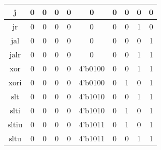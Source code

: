 \documentclass[UTF8]{ctexart}
\begin{document}
\begin{table}[H]
\begin{threeparttable}
\begin{tabular}{|c|c|c|c|c|c|c|c|c|c|}
			\hline
			j                                        & 0                 & 0                 & 0               & 0                 & 0                & 0                & 0               & 0               & 0                 \\
			\hline
			jr                                       & 0                 & 0                 & 0               & 0                 & 0                & 0                & 0               & 1               & 0                 \\
			\hline
			jal                                      & 0                 & 0                 & 0               & 0                 & 0                & 0                & 0               & 0               & 1                 \\
			\hline
			jalr                                     & 0                 & 0                 & 0               & 0                 & 0                & 0                & 0               & 1               & 1                 \\
			\hline
			xor                                      & 0                 & 0                 & 0               & 0                 & 4'b0100          & 0                & 0               & 1               & 1                 \\
			\hline
			xori                                     & 0                 & 0                 & 0               & 0                 & 4'b0100          & 0                & 1               & 0               & 1                 \\
			\hline
			slt                                      & 0                 & 0                 & 0               & 0                 & 4'b1010          & 0                & 0               & 1               & 1                 \\
			\hline
			slti                                     & 0                 & 0                 & 0               & 0                 & 4'b1010          & 0                & 1               & 0               & 1                 \\
			\hline
			sltiu                                    & 0                 & 0                 & 0               & 0                 & 4'b1011          & 0                & 1               & 0               & 1                 \\
			\hline
			sltu                                     & 0                 & 0                 & 0               & 0                 & 4'b1011          & 0                & 0               & 1               & 1                 \\
			\hline
		\end{tabular}
	\end{threeparttable}
\end{table}
\end{document}
